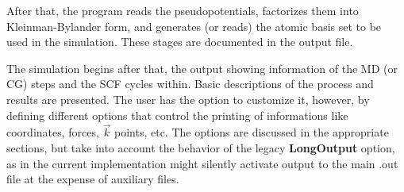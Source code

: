 After that, the program reads the pseudopotentials, factorizes them
into Kleinman-Bylander form, and generates (or reads) the atomic basis
set to be used in the simulation. These stages are documented in the
output file.

The simulation begins after that, the output showing information of
the MD (or CG) steps and the SCF cycles within.  Basic descriptions of
the process and results are presented. The user has the option to
customize it, however, by defining
different options that control the printing of informations like
coordinates, forces, $\vec k$ points, etc.  The options are discussed
in the appropriate sections, but take into account the behavior of the
legacy \textbf{LongOutput} option, as in the current implementation might
silently activate output to the main .out file at the expense of
auxiliary files.

